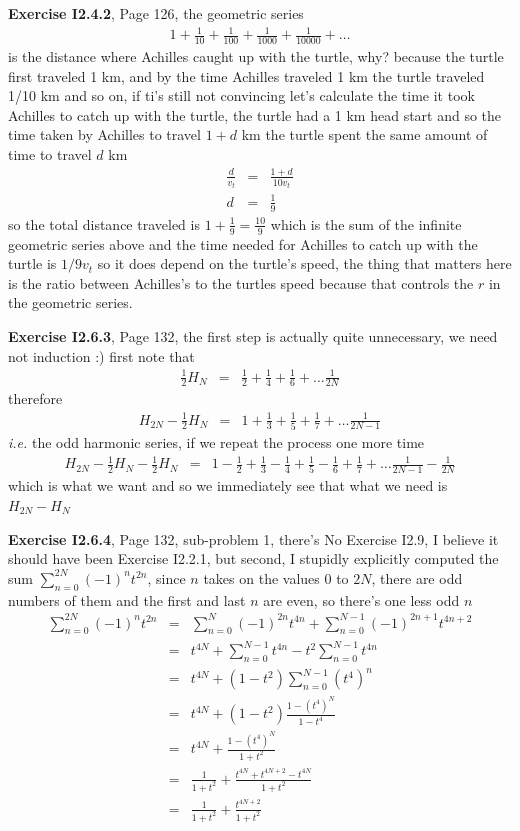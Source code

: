 \documentclass[aps,preprint,preprintnumbers,nofootinbib,showpacs,prd]{revtex4-1}
\newcommand{\ie}{{\it i.e.} }
\newcommand{\nbea}{\begin{eqnarray*}}
\newcommand{\neea}{\end{eqnarray*}}
\begin{document}
{\bf Exercise I2.4.2}, Page 126, the geometric series
%
\nbea
1 + \frac{1}{10} + \frac{1}{100} + \frac{1}{1000} + \frac{1}{10000} + \ldots
\neea
%
is the distance where Achilles caught up with the turtle, why? because the turtle first traveled 1 km, and by the time Achilles traveled 1 km the turtle traveled 1/10 km and so on, if ti's still not convincing let's calculate the time it took Achilles to catch up with the turtle, the turtle had a 1 km head start and so the time taken by Achilles to travel $1+d$ km the turtle spent the same amount of time to travel $d$ km
%
\nbea
\frac{d}{v_t} & = & \frac{1+d}{10v_t} \\
d & = & \frac{1}{9}
\neea
%
so the total distance traveled is $1 + \frac{1}{9} = \frac{10}{9}$ which is the sum of the infinite geometric series above and the time needed for Achilles to catch up with the turtle is $1/9v_t$ so it does depend on the turtle's speed, the thing that matters here is the ratio between Achilles's to the turtles speed because that controls the $r$ in the geometric series.

{\bf Exercise I2.6.3}, Page 132, the first step is actually quite unnecessary, we need not induction :) first note that
%
\nbea
\frac{1}{2} H_N & = & \frac{1}{2} + \frac{1}{4} + \frac{1}{6} + \ldots \frac{1}{2N}
\neea
%
therefore
%
\nbea
H_{2N} - \frac{1}{2}H_N & = & 1 + \frac{1}{3} + \frac{1}{5} + \frac{1}{7} + \ldots \frac{1}{2N-1}
\neea
%
\ie the odd harmonic series, if we repeat the process one more time
%
\nbea
H_{2N} - \frac{1}{2}H_N - \frac{1}{2}H_N & = & 1 -\frac{1}{2}+ \frac{1}{3} -\frac{1}{4}+ \frac{1}{5} - \frac{1}{6} +\frac{1}{7} + \ldots \frac{1}{2N-1} - \frac{1}{2N}
\neea
%
which is what we want and so we immediately see that what we need is $H_{2N} - H_N$

{\bf Exercise I2.6.4}, Page 132, sub-problem 1, there's No Exercise I2.9, I believe it should have been Exercise I2.2.1, but second, I stupidly explicitly computed the sum $\sum_{n=0}^{2N}(-1)^nt^{2n}$, since $n$ takes on the values $0$ to $2N$, there are odd numbers of them and the first and last $n$ are even, so there's one less odd $n$
%
\nbea
\sum_{n=0}^{2N}(-1)^nt^{2n} & = & \sum_{n=0}^{N}(-1)^{2n}t^{4n} + \sum_{n=0}^{N-1}(-1)^{2n+1}t^{4n+2} \\
& = & t^{4N} + \sum_{n=0}^{N-1}t^{4n} - t^2 \sum_{n=0}^{N-1}t^{4n} \\
& = & t^{4N} + (1 - t^2) \sum_{n=0}^{N-1}(t^{4})^{n} \\
& = & t^{4N} + (1 - t^2) \frac{1-(t^4)^{N}}{1-t^4} \\
& = & t^{4N} + \frac{1-(t^4)^{N}}{1+t^2} \\
& = & \frac{1}{1+t^2} + \frac{t^{4N} + t^{4N+2} - t^{4N}}{1+t^2} \\
& = & \frac{1}{1+t^2} + \frac{t^{4N+2}}{1+t^2} 
\neea
%
\end{document}

